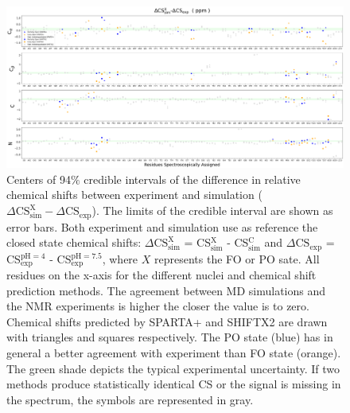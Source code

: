 \documentclass[%
 aip,
 amsmath,amssymb,
 preprint,%
]{revtex4-1}
\begin{document}
\begin{figure}
	\includegraphics[width=\textwidth]{figures_SI/assignment_skew_model_all_print.png}
	 \caption{\scriptsize
Centers of 94$\%$ credible intervals of the difference in relative chemical shifts between experiment and simulation ($\Delta\text{CS}_{\text{sim}}^{\text{X}}-\Delta\text{CS}_{\text{exp}}$). The limits of the credible interval are shown as error bars. Both experiment and simulation use as reference the closed state chemical shifts: $\Delta\text{CS}_{\text{sim}}^{\text{X}}$ = CS$_{\text{sim}}^{\text{X}}$ - CS$_{\text{sim}}^{\text{C}}$  and $\Delta\text{CS}_{\text{exp}}$ = CS$_{\text{exp}}^{\text{pH}=4}$ - CS$_{\text{exp}}^{\text{pH}=7.5}$, where $X$ represents the FO or PO sate. All residues on the x-axis for the different nuclei and chemical shift prediction methods. The agreement between MD simulations and the NMR experiments is higher the closer the value is to zero. Chemical shifts predicted by SPARTA+ and SHIFTX2 are drawn with triangles and squares respectively. The PO state (blue) has in general a better agreement with experiment than FO state (orange). The green shade depicts the typical experimental uncertainty. If two methods produce statistically identical CS or the signal is missing in the spectrum, the symbols are represented in gray.}
\label{SI_assignment_all}
\end{figure}
\end{document}
